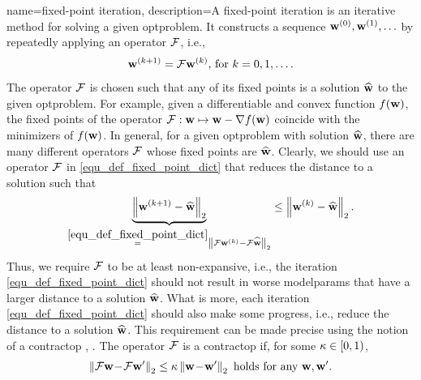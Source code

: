 {name={fixed-point iteration},
	description={A fixed-point iteration is an iterative method for solving 
		a given \gls{optproblem}. It constructs a sequence ${\bf w}^{(0)}, {\bf w}^{(1)}, \ldots$ by 
		 repeatedly applying an operator $\mathcal{F}$, i.e.,
		 \begin{equation} 
		 	\label{equ_def_fixed_point_dict} 
		 	{\bf w}^{(k+1)} = \mathcal{F} {\bf w}^{(k)} \mbox{, for } k=0, 1, \ldots.
		 \end{equation} 
		 The operator $\mathcal{F}$ is chosen such that any of its fixed points is a solution 
		 $\widehat{{\bf w}}$ to the given \gls{optproblem}. For example, given a \gls{differentiable} and 
		 \gls{convex} \gls{function} $f({\bf w})$, the fixed points of the operator $\mathcal{F}: {\bf w} \mapsto {\bf w} - \nabla f({\bf w})$ 
		 coincide with the minimizers of $f({\bf w})$. In general, for a given \gls{optproblem} with solution $\widehat{{\bf w}}$, 
		 there are many different operators $\mathcal{F}$ whose fixed points are $\widehat{{\bf w}}$. 
		 Clearly, we should use an operator $\mathcal{F}$ in \eqref{equ_def_fixed_point_dict} that reduces the distance to a solution such that 
		\begin{equation} 
			\nonumber
			\underbrace{\left\Vert { {\bf w}^{(k+1)} - \widehat{\mathbf{w}}} \right\Vert_{2}}_{\stackrel{\eqref{equ_def_fixed_point_dict}}{=} \left\Vert { \mathcal{F}{\bf w}^{(k)} - \mathcal{F}\widehat{{\bf w}}} \right\Vert_{2}}  \leq 	\left\Vert { {\bf w}^{(k)} - \widehat{{\bf w}}} \right\Vert_{2}. 
		\end{equation}
		Thus, we require $\mathcal{F}$ to be at least non-expansive, i.e., the iteration \eqref{equ_def_fixed_point_dict} 
		should not result in worse \gls{modelparams} that have a larger distance to a solution $\widehat{{\bf w}}$. 
		What is more, each iteration \eqref{equ_def_fixed_point_dict} should also make some progress, i.e., 
		reduce the distance to a solution $\widehat{{\bf w}}$. This requirement can be made precise using 
		the notion of a \gls{contractop} \cite{Bauschke:2017}, \cite{fixedpoinIsta}. 
		The operator $\mathcal{F}$ is a \gls{contractop} if, for some $\kappa \in [0,1)$,
		\begin{equation} 
			\nonumber
			\left\Vert { \mathcal{F}{\bf w}\!-\!\mathcal{F}{\bf w}'} \right\Vert_{2}  \leq  \kappa	\left\Vert {{\bf w}\!-\!{\bf w}'} \right\Vert_{2} \mbox{ holds for any } {\bf w},{\bf w}'.
		\end{equation}
}}
